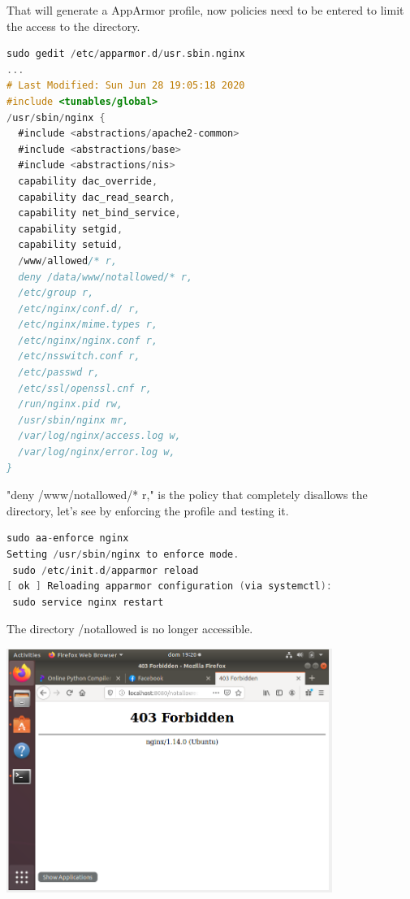 \documentclass[12pt,a4paper]{article} %
\begin{document}
That will generate a AppArmor profile, now policies need to be entered to limit the access to the directory.
\begin{mdframed}[backgroundcolor=light-gray, roundcorner=10pt,leftmargin=1, rightmargin=1, innerleftmargin=15, innertopmargin=15,innerbottommargin=15, outerlinewidth=1, linecolor=light-gray] \begin{lstlisting}[language=C]
sudo gedit /etc/apparmor.d/usr.sbin.nginx
...
# Last Modified: Sun Jun 28 19:05:18 2020
#include <tunables/global>
/usr/sbin/nginx {
  #include <abstractions/apache2-common>
  #include <abstractions/base>
  #include <abstractions/nis>
  capability dac_override,
  capability dac_read_search,
  capability net_bind_service,
  capability setgid,
  capability setuid,
  /www/allowed/* r,
  deny /data/www/notallowed/* r,
  /etc/group r,
  /etc/nginx/conf.d/ r,
  /etc/nginx/mime.types r,
  /etc/nginx/nginx.conf r,
  /etc/nsswitch.conf r,
  /etc/passwd r,
  /etc/ssl/openssl.cnf r,
  /run/nginx.pid rw,
  /usr/sbin/nginx mr,
  /var/log/nginx/access.log w,
  /var/log/nginx/error.log w,
}
\end{lstlisting} \end{mdframed}
"deny /www/notallowed/* r," is the policy that completely disallows the directory, let's see by enforcing the profile and testing it.

\begin{mdframed}[backgroundcolor=light-gray, roundcorner=10pt,leftmargin=1, rightmargin=1, innerleftmargin=15, innertopmargin=15,innerbottommargin=15, outerlinewidth=1, linecolor=light-gray] \begin{lstlisting}[language=C]
 sudo aa-enforce nginx
Setting /usr/sbin/nginx to enforce mode.
 sudo /etc/init.d/apparmor reload
[ ok ] Reloading apparmor configuration (via systemctl):
 sudo service nginx restart
\end{lstlisting} \end{mdframed}

The directory /notallowed is no longer accessible.

    \includegraphics[width=\textwidth, height=300px]{snip1.1.PNG}
\end{document}
